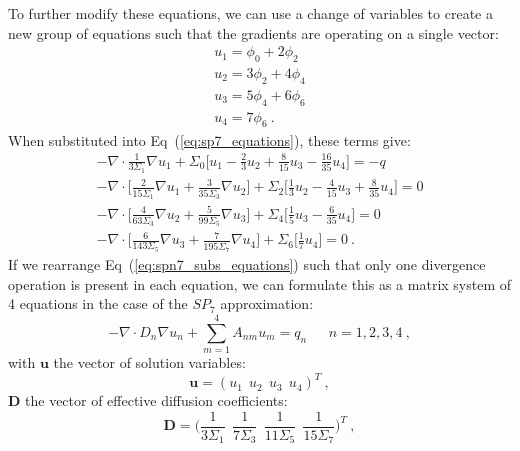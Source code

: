 To further modify these equations, we can use a change of variables to
create a new group of equations such that the gradients are operating
on a single vector:
\begin{subequations}
  \begin{gather}
    u_1 = \phi_0 + 2\phi_2 \\
    u_2 = 3\phi_2 + 4\phi_4 \\
    u_3 = 5\phi_4 + 6\phi_6 \\
    u_4 = 7\phi_6 \:.
  \end{gather}
  \label{eq:spn7_subs}
\end{subequations}
When substituted into Eq~(\ref{eq:sp7_equations}), these terms give:
\begin{subequations}
  \begin{gather}
    -\nabla \cdot \frac{1}{3 \Sigma_1} \nabla u_1 + \Sigma_0 \Bigg[
    u_1 - \frac{2}{3}u_2 + \frac{8}{15}u_3 - \frac{16}{35}u_4 \Bigg]
    = -q \\
    -\nabla \cdot \Bigg[ \frac{2}{15 \Sigma_1} \nabla u_1 +
    \frac{3}{35 \Sigma_3} \nabla u_2 \Bigg] + \Sigma_2 \Bigg[
    \frac{1}{3}u_2 - \frac{4}{15}u_3 + \frac{8}{35}u_4 \Bigg] = 0 \\
    -\nabla \cdot \Bigg[ \frac{4}{63 \Sigma_3} \nabla u_2 +
    \frac{5}{99 \Sigma_5} \nabla u_3 \Bigg] + \Sigma_4 \Bigg[
    \frac{1}{5}u_3 - \frac{6}{35}u_4 \Bigg] = 0 \\ 
    -\nabla \cdot \Bigg[ \frac{6}{143 \Sigma_5} \nabla u_3 +
    \frac{7}{195 \Sigma_7} \nabla u_4 \Bigg] + \Sigma_6 \Bigg[
    \frac{1}{7}u_4 \Bigg] = 0 \:.
  \end{gather}
  \label{eq:spn7_subs_equations}
\end{subequations}
If we rearrange Eq~(\ref{eq:spn7_subs_equations}) such that only one
divergence operation is present in each equation, we can formulate
this as a matrix system of 4 equations in the case of the $SP_7$
approximation:
\begin{equation}
  -\nabla \cdot D_n \nabla u_n + \sum_{m=1}^4 A_{nm} u_m =
  q_n\ \ \ \ \ \ \ n = 1,2,3,4\:,
  \label{eq:spn_matrix}
\end{equation}
with $\mathbf{u}$ the vector of solution variables:
\begin{equation}
  \mathbf{u} = ( u_1\ \ u_2\ \ u_3\ \ u_4 )^T \:,
  \label{eq:spn7_solution_vector}
\end{equation}
$\mathbf{D}$ the vector of effective diffusion coefficients:
\begin{equation}
  \mathbf{D} = \Bigg( \frac{1}{3\Sigma_1}\ \ \frac{1}{7\Sigma_3}\ \
  \frac{1}{11\Sigma_5}\ \ \frac{1}{15\Sigma_7} \Bigg)^T\:,
  \label{eq:spn7_diffusion_coeffs}
\end{equation}
